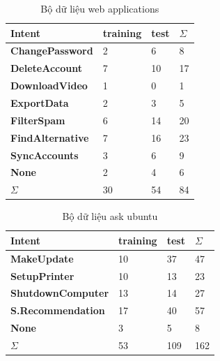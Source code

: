 \begin{table}[]
\begin{center}
\begin{tabular}{|l|l|l|l|}
\hline
Intent                   & \textbf{training} & \textbf{test} & $\Sigma$  \\ \hline
\textbf{ChangePassword}  & 2                 & 6             & 8  \\ \hline
\textbf{DeleteAccount}   & 7                 & 10            & 17 \\ \hline
\textbf{DownloadVideo}   & 1                 & 0             & 1  \\ \hline
\textbf{ExportData}      & 2                 & 3             & 5  \\ \hline
\textbf{FilterSpam}      & 6                 & 14            & 20 \\ \hline
\textbf{FindAlternative} & 7                 & 16            & 23 \\ \hline
\textbf{SyncAccounts}    & 3                 & 6             & 9  \\ \hline
\textbf{None}            & 2                 & 4             & 6  \\ \hline
$\Sigma$                      & 30                & 54            & 84 \\ \hline
\end{tabular}
\caption{Bộ dữ liệu web applications}
    \label{fig:comparisonimg-webappdatasets}
    \end{center}
\end{table}



\begin{table}[]
\begin{center}
\begin{tabular}{|l|l|l|l|}
\hline
Intent                    & \textbf{training} & \textbf{test} & $\Sigma$   \\ \hline
\textbf{MakeUpdate}       & 10                & 37            & 47  \\ \hline
\textbf{SetupPrinter}     & 10                & 13            & 23  \\ \hline
\textbf{ShutdownComputer} & 13                & 14            & 27  \\ \hline
\textbf{S.Recommendation} & 17                & 40            & 57  \\ \hline
\textbf{None}             & 3                 & 5             & 8   \\ \hline
$\Sigma$                         & 53                & 109           & 162 \\ \hline
\end{tabular}
  \caption{Bộ dữ liệu ask ubuntu}
    \label{fig:comparisonimg-askubuntudatasets}
    \end{center}
\end{table}




